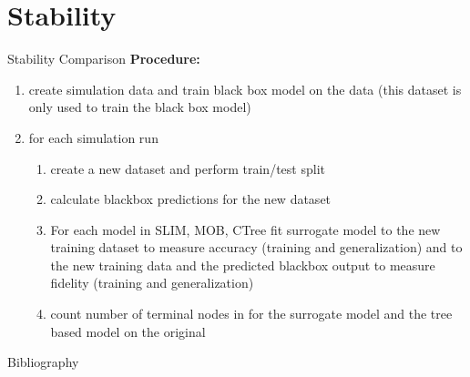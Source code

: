 \documentclass[9pt, xcolor=table]{beamer}
\begin{document}
\section{Stability}
\begin{frame}{Stability Comparison}
\textbf{Procedure:} 
\begin{enumerate}
    \item create simulation data and train black box model on the data (this dataset is only used to train the black box model)
    \item for each simulation run 
    \begin{enumerate}
        \item create a new dataset and perform train/test split
        \item calculate blackbox predictions for the new dataset
        \item For each model in SLIM, MOB, CTree fit surrogate model to the new training dataset to measure accuracy (training and generalization) and to the new training data and the predicted blackbox output to measure fidelity (training and generalization)
        \item count number of terminal nodes in for the surrogate model and the tree based model on the original 
    \end{enumerate}
\end{enumerate}
\end{frame}


\begin{frame}{Bibliography}
    
    

\end{frame}
\end{document}
